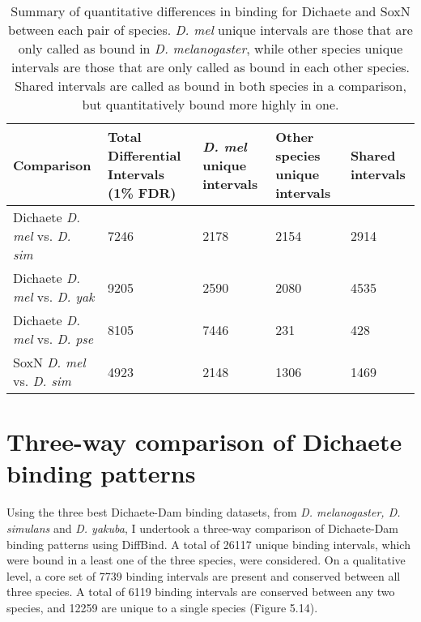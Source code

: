 \begin{table}[h]
\centering
\begin{tabular}{|p{3cm}|p{2.5cm}|p{2.5cm}|p{2.5cm}|p{2.5cm}|}
\hline
\textbf{Comparison}                 & \textbf{Total Differential Intervals (1\% FDR)} & \textbf{\emph{D. mel} unique intervals} & \textbf{Other species unique intervals} & \textbf{Shared intervals} \\ \hline
Dichaete \emph{D. mel} vs. \emph{D. sim} & 7246                                   & 2178                    & 2154                           & 2914             \\ \hline
Dichaete \emph{D. mel} vs. \emph{D. yak} & 9205                                   & 2590                    & 2080                           & 4535             \\ \hline
Dichaete \emph{D. mel} vs. \emph{D. pse} & 8105                                   & 7446                    & 231                            & 428              \\ \hline
SoxN \emph{D. mel} vs. \emph{D. sim}     & 4923                                   & 2148                    & 1306                           & 1469             \\ \hline
\end{tabular}
\caption{Summary of quantitative differences in binding for Dichaete and SoxN between each pair of species. \emph{D. mel} unique intervals are those that are only called as bound in \emph{D. melanogaster}, while other species unique intervals are those that are only called as bound in each other species. Shared intervals are called as bound in both species in a comparison, but quantitatively bound more highly in one.}
\label{Table 5.1}
\end{table}

\section{Three-way comparison of Dichaete binding patterns}
Using the three best Dichaete-Dam binding datasets, from \emph{D. melanogaster, D. simulans} and \emph{D. yakuba}, I undertook a three-way comparison of Dichaete-Dam binding patterns using DiffBind. A total of 26117 unique binding intervals, which were bound in a least one of the three species, were considered. On a qualitative level, a core set of 7739 binding intervals are present and conserved between all three species. A total of 6119 binding intervals are conserved between any two species, and 12259 are unique to a single species (Figure 5.14).\\

